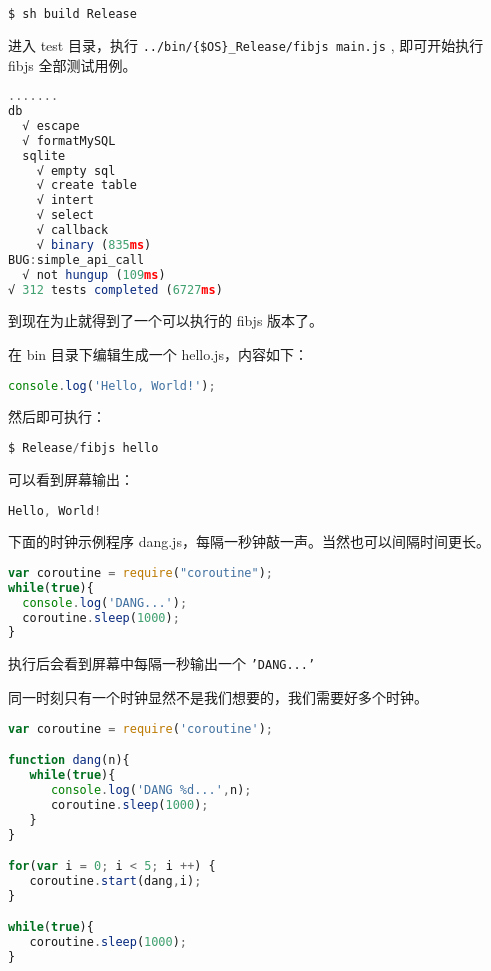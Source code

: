 \begin{lstlisting}[language=JavaScript]
$ sh build Release
\end{lstlisting}

进入 test 目录，执行 \texttt{../bin/\{\$OS\}\_Release/fibjs main.js} , 即可开始执行 fibjs 全部测试用例。


\begin{lstlisting}[language=JavaScript]
.......
db
  √ escape
  √ formatMySQL
  sqlite
    √ empty sql
    √ create table
    √ intert
    √ select
    √ callback
    √ binary (835ms) 
BUG:simple_api_call
  √ not hungup (109ms) 
√ 312 tests completed (6727ms)
\end{lstlisting}



到现在为止就得到了一个可以执行的 fibjs 版本了。

在 bin 目录下编辑生成一个 hello.js，内容如下：


\begin{lstlisting}[language=JavaScript]
console.log('Hello, World!');
\end{lstlisting}

然后即可执行：




\begin{lstlisting}[language=JavaScript]
$ Release/fibjs hello
\end{lstlisting}

可以看到屏幕输出：




\begin{lstlisting}[language=JavaScript]
Hello, World!
\end{lstlisting}

下面的时钟示例程序 dang.js，每隔一秒钟敲一声。当然也可以间隔时间更长。


\begin{lstlisting}[language=JavaScript]
var coroutine = require("coroutine");
while(true){
  console.log('DANG...');
  coroutine.sleep(1000);
}
\end{lstlisting}

执行后会看到屏幕中每隔一秒输出一个 \texttt{'DANG...'}

同一时刻只有一个时钟显然不是我们想要的，我们需要好多个时钟。


\begin{lstlisting}[language=JavaScript]
var coroutine = require('coroutine');

function dang(n){
   while(true){
      console.log('DANG %d...',n);
      coroutine.sleep(1000);
   }
}

for(var i = 0; i < 5; i ++) {
   coroutine.start(dang,i);
}

while(true){
   coroutine.sleep(1000);
}
\end{lstlisting}

